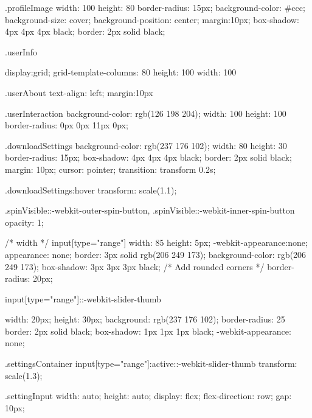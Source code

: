 \documentclass[12pt]{article} %
\begin{document}
\begin{htmlcode}[caption={CSS Stlye Sheet}]
{    }
    
    .profileImage
    {
          width: 100%
          height: 80%
          border-radius: 15px;
          background-color: #ccc;
          background-size: cover;
          background-position: center;
          margin:10px;
          box-shadow: 4px 4px 4px black;
          border: 2px solid black;
    }
    
    .userInfo
    {
       display:grid;
       grid-template-columns: 80%
       height: 100%
       width: 100%
    
    }
    
    .userAbout
    {
       text-align: left;
       margin:10px
    }
    
    
    .userInteraction
    {
       background-color: rgb(126 198 204);
       width: 100%
       height: 100%
       border-radius: 0px 0px 11px 0px;
    }
    
    
    .downloadSettings{
       background-color: rgb(237 176 102);
       width: 80%
       height: 30%
       border-radius: 15px;
       box-shadow: 4px 4px 4px black;
       border: 2px solid black;
       margin: 10px;
       cursor: pointer;
       transition: transform 0.2s; 
    }
    
    .downloadSettings:hover {
       transform: scale(1.1);
    }
    
    
    .spinVisible::-webkit-outer-spin-button,
    .spinVisible::-webkit-inner-spin-button 
    {
        opacity: 1;
    }
    
    /* width */
    input[type="range"] {
       width: 85%
       height: 5px;
       -webkit-appearance:none;
       appearance: none;
       border: 3px solid rgb(206 249 173);
       background-color: rgb(206 249 173);
       box-shadow: 3px 3px 3px black;
       /* Add rounded corners */
       border-radius: 20px;
     }
    
     input[type="range"]::-webkit-slider-thumb 
     {
       width: 20px;
       height: 30px;
       background: rgb(237 176 102);
       border-radius: 25%
       border: 2px solid black;
       box-shadow: 1px 1px 1px black;
       -webkit-appearance: none;
    
     }
    
     .settingsContainer input[type="range"]:active::-webkit-slider-thumb {
       transform: scale(1.3);
    }
    
    .settingInput
    {
       width: auto;
       height: auto;
       display: flex;
       flex-direction: row;
       gap: 10px;
    }
    

\end{htmlcode}
\end{document}
